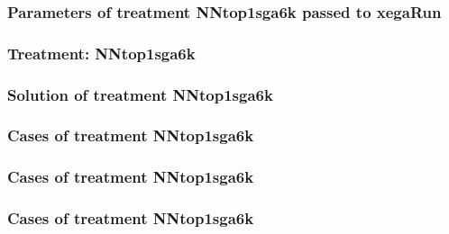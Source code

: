 \documentclass[18pt,c]{beamer}
\begin{document}

 \begin{frame}
 \fontsize{8pt}{9pt}\selectfont
 \frametitle{  Parameters of treatment NNtop1sga6k passed to xegaRun
 }

 \label{ExpDtParmTable014.tex}  
 \end{frame}

 \begin{frame}
 \fontsize{8pt}{9pt}\selectfont
 \frametitle{ Treatment: NNtop1sga6k }

 \label{ExpDStatsTable007.tex}  
 \end{frame}

 \begin{frame}
 \fontsize{8pt}{9pt}\selectfont
 \frametitle{ Solution of treatment NNtop1sga6k }

 \label{ExpDSolutionTable011.tex}  
 \end{frame}

 \begin{frame}
 \fontsize{8pt}{9pt}\selectfont
 \frametitle{ Cases of treatment NNtop1sga6k }

 \label{ExpDSolutionTable012.tex}  
 \end{frame}

 \begin{frame}
 \fontsize{8pt}{9pt}\selectfont
 \frametitle{ Cases of treatment NNtop1sga6k }

 \label{ExpDSolutionTable013.tex}  
 \end{frame}

 \begin{frame}
 \fontsize{8pt}{9pt}\selectfont
 \frametitle{ Cases of treatment NNtop1sga6k }

 \label{ExpDSolutionTable014.tex}  
 \end{frame}
\end{document}
